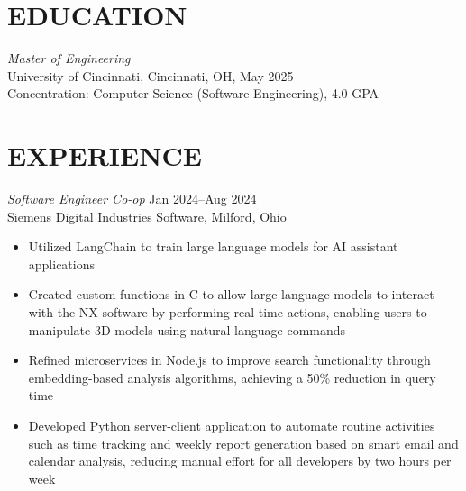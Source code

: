 \documentclass[margin]{res} %
\begin{document}
\begin{resume}
\vspace*{-5.0mm}


\section{EDUCATION}

{\sl Master of Engineering\/}\\
University of Cincinnati, Cincinnati, OH, May 2025 \\
Concentration: Computer Science (Software Engineering), 4.0 GPA

 
\section{EXPERIENCE}
{\sl Software Engineer Co-op\/} \hfill {\color{black} Jan 2024--Aug 2024} \\
Siemens Digital Industries Software, Milford, Ohio
\vspace{1mm}
\begin{itemize}  %
\item Utilized LangChain to train large language models for AI assistant applications 
\item Created custom functions in C to allow large language models to interact with the NX software by performing real-time actions, enabling users to manipulate 3D models using natural language commands 
\item Refined microservices in Node.js to improve search functionality through\\embedding-based analysis algorithms, achieving a 50\% reduction in query time 
\item Developed Python server-client application to automate routine activities such as time tracking and weekly report generation based on smart email and calendar analysis, reducing manual effort for all developers by two hours per week
\end{itemize}



\end{resume}
\end{document}
